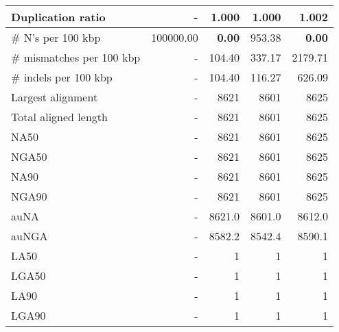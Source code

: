 \documentclass[12pt,a4paper]{article}
\begin{document}
\begin{table}[ht]
\begin{center}
\begin{tabular}{|l*{4}{|r}|}
Duplication ratio & - & 1.000 & 1.000 & 1.002 \\ \hline
\# N's per 100 kbp & 100000.00 & {\bf 0.00} & 953.38 & {\bf 0.00} \\ \hline
\# mismatches per 100 kbp & - & 104.40 & 337.17 & 2179.71 \\ \hline
\# indels per 100 kbp & - & 104.40 & 116.27 & 626.09 \\ \hline
Largest alignment & - & 8621 & 8601 & 8625 \\ \hline
Total aligned length & - & 8621 & 8601 & 8625 \\ \hline
NA50 & - & 8621 & 8601 & 8625 \\ \hline
NGA50 & - & 8621 & 8601 & 8625 \\ \hline
NA90 & - & 8621 & 8601 & 8625 \\ \hline
NGA90 & - & 8621 & 8601 & 8625 \\ \hline
auNA & - & 8621.0 & 8601.0 & 8612.0 \\ \hline
auNGA & - & 8582.2 & 8542.4 & 8590.1 \\ \hline
LA50 & - & 1 & 1 & 1 \\ \hline
LGA50 & - & 1 & 1 & 1 \\ \hline
LA90 & - & 1 & 1 & 1 \\ \hline
LGA90 & - & 1 & 1 & 1 \\ \hline
\end{tabular}
\end{center}
\end{table}
\end{document}
